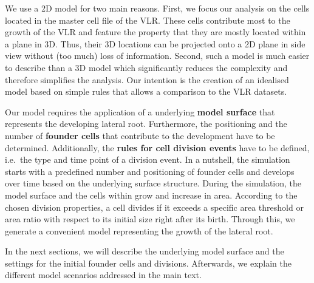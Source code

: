 \documentclass[11pt,a4paper, final]{article}
\begin{document}
We use a 2D model for two main reasons. First, we focus our analysis on the cells located in the master cell file of the VLR. These cells contribute most to the growth of the VLR and feature the property that they are mostly located within a plane in 3D. Thus, their 3D locations can be projected onto a 2D plane in side view without (too much) loss of information. Second, such a model is much easier to describe than a 3D model which significantly reduces the complexity and therefore simplifies the analysis. Our intention is the creation of an idealised model based on simple rules that allows a comparison to the VLR datasets.

\noindent
Our model requires the application of a underlying \textbf{model surface} that represents the developing lateral root. Furthermore, the positioning and the number of \textbf{founder cells} that contribute to the development have to be determined. Additionally, the \textbf{rules for cell division events} have to be defined, i.e.~the type and time point of a division event. In a nutshell, the simulation starts with a predefined number and positioning of founder cells and develops over time based on the underlying surface structure. During the simulation, the model surface and the cells within grow and increase in area. According to the chosen division properties, a cell divides if it exceeds a specific area threshold or area ratio with respect to its initial size right after its birth. Through this, we generate a convenient model representing the growth of the lateral root.

In the next sections, we will describe the underlying model surface and the settings for the initial founder cells and divisions. Afterwards, we explain the different model scenarios addressed in the main text.
\end{document}
